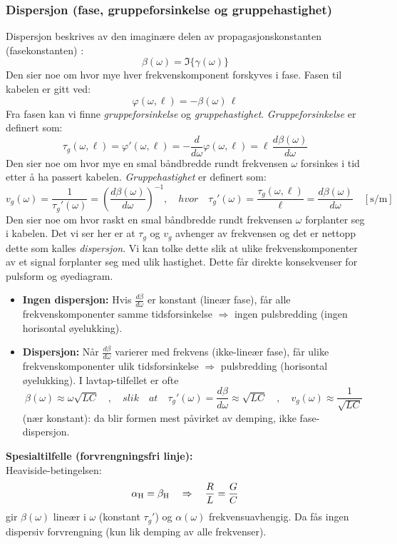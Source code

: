 \subsubsection{Dispersjon (fase, gruppeforsinkelse og gruppehastighet)}
Dispersjon beskrives av den imaginære delen av propagasjonskonstanten (fasekonstanten) \cite{HaytBuck2018}:
\[
    \beta(\omega)=\Im\{\gamma(\omega)\}
\]
Den sier noe om hvor mye hver frekvenskomponent forskyves i fase.
Fasen til kabelen er gitt ved:
\[
\varphi(\omega,\ell) = -\beta(\omega)\,\ell
\]
Fra fasen kan vi finne \emph{gruppeforsinkelse} og \emph{gruppehastighet}.
\emph{Gruppeforsinkelse} er definert som:
\[
\tau_g(\omega,\ell) = \varphi'(\omega,\ell) = -\frac{d}{d\omega}\varphi(\omega,\ell) = \ell\,\frac{d\beta(\omega)}{d\omega}
\]
Den sier noe om hvor mye en smal båndbredde rundt frekvensen \(\omega\) forsinkes i tid etter å ha passert kabelen. \emph{Gruppehastighet} er definert som:
\[
v_g(\omega) = \frac{1}{\tau_{g}'(\omega)} = \left(\frac{d\beta(\omega)}{d\omega}\right)^{-1}, \quad hvor \quad \tau_g'(\omega) = \frac{\tau_g(\omega,\ell)}{\ell} = \frac{d\beta(\omega)}{d\omega} \quad [\mathrm{s/m}]
\]
\noindent Den sier noe om hvor raskt en smal båndbredde rundt frekvensen \(\omega\) forplanter seg i kabelen. Det vi ser her er at \(\tau_g\) og \(v_g\) avhenger av frekvensen og det er nettopp dette som kalles \emph{dispersjon}. Vi kan tolke dette slik at ulike frekvenskomponenter av et signal forplanter seg med ulik hastighet. 
\clearpage
\noindent Dette får direkte konsekvenser for pulsform og øyediagram.\\
\begin{itemize}[leftmargin=2.8em,style=nextline]
  \item \textbf{Ingen dispersjon:} Hvis \(\frac{d\beta}{d\omega} \) er konstant (lineær fase), får alle frekvenskomponenter samme tidsforsinkelse \(\Rightarrow\) ingen pulsbredding (ingen horisontal øyelukking).\\
  \item \textbf{Dispersjon:} Når \(\frac{d\beta}{d\omega}\) varierer med frekvens (ikke-lineær fase), får ulike frekvenskomponenter ulik tidsforsinkelse \(\Rightarrow\) pulsbredding (horisontal øyelukking). I lavtap-tilfellet er ofte 
  \[
    \beta(\omega)\approx \omega\sqrt{LC}\quad,\quad slik\quad at \quad \tau_{g}'(\omega)=\frac{d\beta}{d\omega}\approx \sqrt{LC}\quad,\quad v_g(\omega)\approx \frac{1}{\sqrt{LC}}
  \]
  (nær konstant): da blir formen mest påvirket av demping, ikke fase-dispersjon.\\
\end{itemize}
\textbf{Spesialtilfelle (forvrengningsfri linje):}\\
Heaviside-betingelsen:
\[
    \alpha_{\mathrm{H}} = \beta_{\mathrm{H}} \quad \Rightarrow \quad \frac{R}{L}=\frac{G}{C}
\]
gir \(\beta(\omega)\) lineær i \(\omega\)
(konstant \(\tau_g'\)) og \(\alpha(\omega)\) frekvensuavhengig. Da fås ingen dispersiv forvrengning (kun lik demping av alle frekvenser).
